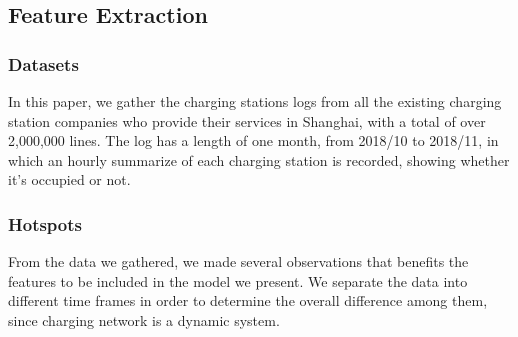 \subsection{Feature Extraction}

\subsubsection{Datasets}
In this paper, we gather the charging stations logs from all the existing charging station companies who provide their services in Shanghai, with a total of over 2,000,000 lines. The log has a length of one month, from 2018/10 to 2018/11, in which an hourly summarize of each charging station is recorded, showing whether it's occupied or not.

\subsubsection{Hotspots}
From the data we gathered, we made several observations that benefits the features to be included in the model we present. We separate the data into different time frames in order to determine the overall difference among them, since charging network is a dynamic system.
